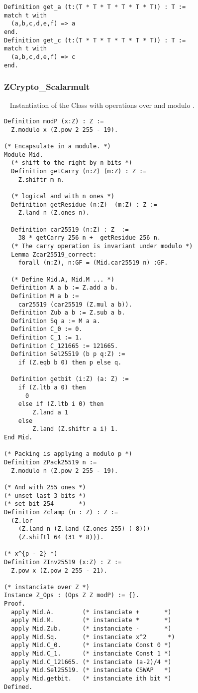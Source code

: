 \begin{lstlisting}[language=Coq]
Definition get_a (t:(T * T * T * T * T * T)) : T :=
match t with
  (a,b,c,d,e,f) => a
end.
Definition get_c (t:(T * T * T * T * T * T)) : T :=
match t with
  (a,b,c,d,e,f) => c
end.
\end{lstlisting}

\subsubsection{ZCrypto\_Scalarmult}
\label{subsubsec:ZCryptoScalarmult}
~
Instantiation of the Class  with operations over \Z and modulo \p.
\begin{lstlisting}[language=Coq]
Definition modP (x:Z) : Z :=
  Z.modulo x (Z.pow 2 255 - 19).

(* Encapsulate in a module. *)
Module Mid.
  (* shift to the right by n bits *)
  Definition getCarry (n:Z) (m:Z) : Z :=
    Z.shiftr m n.

  (* logical and with n ones *)
  Definition getResidue (n:Z)  (m:Z) : Z :=
    Z.land n (Z.ones n).

  Definition car25519 (n:Z) : Z  :=
    38 * getCarry 256 n +  getResidue 256 n.
  (* The carry operation is invariant under modulo *)
  Lemma Zcar25519_correct:
    forall (n:Z), n:GF = (Mid.car25519 n) :GF.

  (* Define Mid.A, Mid.M ... *)
  Definition A a b := Z.add a b.
  Definition M a b :=
    car25519 (car25519 (Z.mul a b)).
  Definition Zub a b := Z.sub a b.
  Definition Sq a := M a a.
  Definition C_0 := 0.
  Definition C_1 := 1.
  Definition C_121665 := 121665.
  Definition Sel25519 (b p q:Z) :=
    if (Z.eqb b 0) then p else q.

  Definition getbit (i:Z) (a: Z) :=
    if (Z.ltb a 0) then
      0
    else if (Z.ltb i 0) then
        Z.land a 1
    else
        Z.land (Z.shiftr a i) 1.
End Mid.

(* Packing is applying a modulo p *)
Definition ZPack25519 n :=
  Z.modulo n (Z.pow 2 255 - 19).

(* And with 255 ones *)
(* unset last 3 bits *)
(* set bit 254       *)
Definition Zclamp (n : Z) : Z :=
  (Z.lor
    (Z.land n (Z.land (Z.ones 255) (-8)))
    (Z.shiftl 64 (31 * 8))).

(* x^{p - 2} *)
Definition ZInv25519 (x:Z) : Z :=
  Z.pow x (Z.pow 2 255 - 21).

(* instanciate over Z *)
Instance Z_Ops : (Ops Z Z modP) := {}.
Proof.
  apply Mid.A.        (* instanciate +       *)
  apply Mid.M.        (* instanciate *       *)
  apply Mid.Zub.      (* instanciate -       *)
  apply Mid.Sq.       (* instanciate x^2      *)
  apply Mid.C_0.      (* instanciate Const 0 *)
  apply Mid.C_1.      (* instanciate Const 1 *)
  apply Mid.C_121665. (* instanciate (a-2)/4 *)
  apply Mid.Sel25519. (* instanciate CSWAP   *)
  apply Mid.getbit.   (* instanciate ith bit *)
Defined.


\end{lstlisting}
